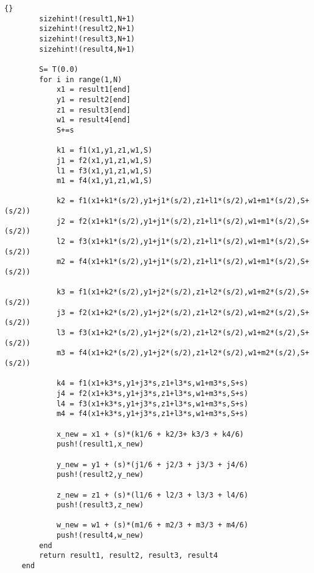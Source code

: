 \begin{lstlisting}[caption =\text{numerical\_scheme.jl}, label =code_numericalscheme]{}
        sizehint!(result1,N+1)
        sizehint!(result2,N+1)
        sizehint!(result3,N+1)
        sizehint!(result4,N+1)

        S= T(0.0)
        for i in range(1,N)
            x1 = result1[end]
            y1 = result2[end]
            z1 = result3[end]
            w1 = result4[end]
            S+=s

            k1 = f1(x1,y1,z1,w1,S)
            j1 = f2(x1,y1,z1,w1,S)
            l1 = f3(x1,y1,z1,w1,S)
            m1 = f4(x1,y1,z1,w1,S)

            k2 = f1(x1+k1*(s/2),y1+j1*(s/2),z1+l1*(s/2),w1+m1*(s/2),S+(s/2))
            j2 = f2(x1+k1*(s/2),y1+j1*(s/2),z1+l1*(s/2),w1+m1*(s/2),S+(s/2))
            l2 = f3(x1+k1*(s/2),y1+j1*(s/2),z1+l1*(s/2),w1+m1*(s/2),S+(s/2))
            m2 = f4(x1+k1*(s/2),y1+j1*(s/2),z1+l1*(s/2),w1+m1*(s/2),S+(s/2))

            k3 = f1(x1+k2*(s/2),y1+j2*(s/2),z1+l2*(s/2),w1+m2*(s/2),S+(s/2))
            j3 = f2(x1+k2*(s/2),y1+j2*(s/2),z1+l2*(s/2),w1+m2*(s/2),S+(s/2))
            l3 = f3(x1+k2*(s/2),y1+j2*(s/2),z1+l2*(s/2),w1+m2*(s/2),S+(s/2))
            m3 = f4(x1+k2*(s/2),y1+j2*(s/2),z1+l2*(s/2),w1+m2*(s/2),S+(s/2))

            k4 = f1(x1+k3*s,y1+j3*s,z1+l3*s,w1+m3*s,S+s)
            j4 = f2(x1+k3*s,y1+j3*s,z1+l3*s,w1+m3*s,S+s)
            l4 = f3(x1+k3*s,y1+j3*s,z1+l3*s,w1+m3*s,S+s)
            m4 = f4(x1+k3*s,y1+j3*s,z1+l3*s,w1+m3*s,S+s)

            x_new = x1 + (s)*(k1/6 + k2/3+ k3/3 + k4/6)
            push!(result1,x_new)

            y_new = y1 + (s)*(j1/6 + j2/3 + j3/3 + j4/6)
            push!(result2,y_new)

            z_new = z1 + (s)*(l1/6 + l2/3 + l3/3 + l4/6)
            push!(result3,z_new)

            w_new = w1 + (s)*(m1/6 + m2/3 + m3/3 + m4/6)
            push!(result4,w_new)
        end
        return result1, result2, result3, result4
    end
\end{lstlisting}
